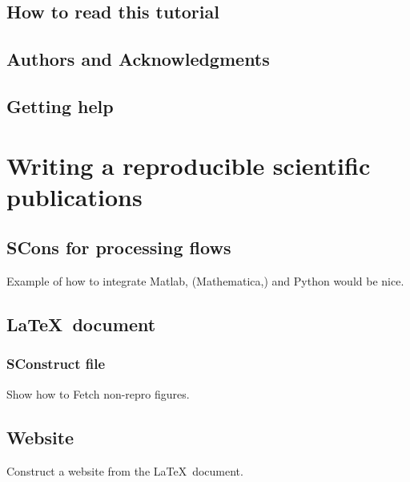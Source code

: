 \subsection{How to read this tutorial}
\subsection{Authors and Acknowledgments}
\subsection{Getting help}

\section{Writing a reproducible scientific publications}
\subsection{SCons for processing flows}

Example of how to integrate Matlab, (Mathematica,) and Python would be
nice.

\subsection{\LaTeX\ document}
\subsubsection{SConstruct file}
Show how to Fetch non-repro figures.

\subsection{Website}

Construct a website from the \LaTeX\ document.


